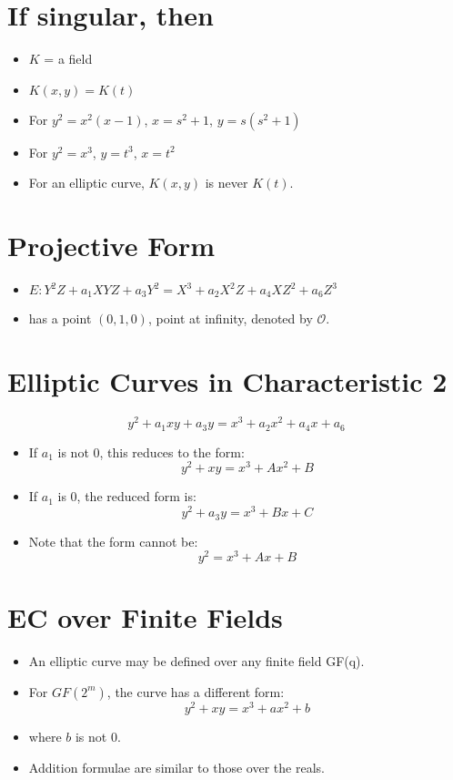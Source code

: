 \section*{If singular, then}

\begin{itemize}
	\item \( K \) = a field
	\item \( K(x, y) = K(t) \)
	\item For \( y^2 = x^2(x-1) \), \( x=s^2+1 \), \( y=s(s^2+1) \)
	\item For \( y^2 = x^3 \), \( y = t^3 \), \( x = t^2 \)
	\item For an elliptic curve, \( K(x, y) \) is never \( K(t) \).
\end{itemize}

\section*{Projective Form}

\begin{itemize}
	\item \( E: Y^2Z + a_1XYZ + a_3Y^2 = X^3 + a_2X^2Z + a_4XZ^2 + a_6Z^3 \)
	\item has a point \( (0, 1, 0) \), point at infinity, denoted by \( \mathcal{O} \).
\end{itemize}

\section*{Elliptic Curves in Characteristic 2}

\[ y^2 + a_1xy + a_3y = x^3 + a_2x^2 + a_4x + a_6 \]

\begin{itemize}
	\item If \( a_1 \) is not 0, this reduces to the form:
	\[ y^2 + xy = x^3 + Ax^2 + B \]
	\item If \( a_1 \) is 0, the reduced form is:
	\[ y^2 + a_3y = x^3 + Bx + C \]
	\item Note that the form cannot be:
	\[ y^2 = x^3 + Ax + B \]
\end{itemize}

\section*{EC over Finite Fields}

\begin{itemize}
	\item An elliptic curve may be defined over any finite field GF(q).
	\item For $GF(2^m)$, the curve has a different form:
	\[ y^2 + xy = x^3 + ax^2 + b \]
	\item where \( b \) is not 0.
	\item Addition formulae are similar to those over the reals.
\end{itemize}

